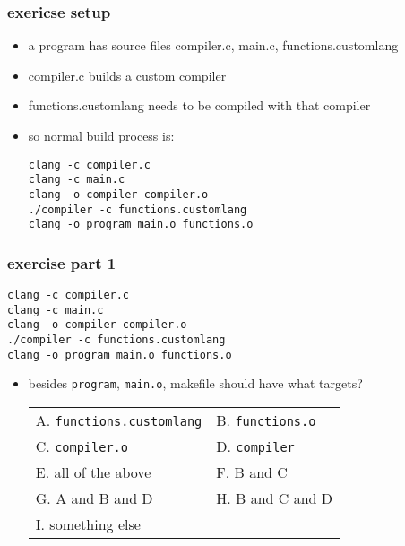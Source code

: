 \begin{FragileFrame}
\frametitle{exericse setup}
    \begin{itemize}
    \item a program has source files compiler.c, main.c, functions.customlang
    \item compiler.c builds a custom compiler
    \item functions.customlang needs to be compiled with that compiler
    \item so normal build process is:
\begin{Verbatim}[frame=single,fontsize=\fontsize{12}{13}]
clang -c compiler.c
clang -c main.c
clang -o compiler compiler.o
./compiler -c functions.customlang
clang -o program main.o functions.o
\end{Verbatim}
    \end{itemize}
\end{FragileFrame}

\begin{FragileFrame}
\frametitle{exercise part 1}
\begin{Verbatim}[frame=single,fontsize=\fontsize{13}{14}]
clang -c compiler.c
clang -c main.c
clang -o compiler compiler.o
./compiler -c functions.customlang
clang -o program main.o functions.o
\end{Verbatim}
    \begin{itemize}
    \item besides \texttt{program}, \texttt{main.o}, makefile should have what targets?
\begin{tabular}{ll}
    A. \texttt{functions.customlang} & B. \texttt{functions.o} \\
    C. \texttt{compiler.o} & D. \texttt{compiler} \\
    E. all of the above & F. B and C \\
    G. A and B and D & H. B and C and D \\
    I. something else 
\end{tabular}
    \end{itemize}
\end{FragileFrame}

